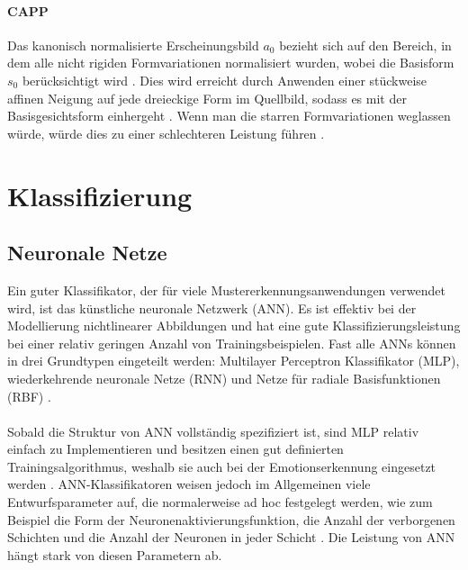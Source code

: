 \documentclass[12pt,a4paper,headinclude,twoside, plainheadsepline, open=right,numbers=noenddot]{scrreprt}
\begin{document}
\paragraph{CAPP}
Das kanonisch normalisierte Erscheinungsbild $a_0$ bezieht sich auf den Bereich, in dem alle nicht rigiden Formvariationen normalisiert wurden, wobei die Basisform $s_0$ berücksichtigt wird \cite{Lucey2010CK+}. Dies wird erreicht durch Anwenden einer stückweise affinen Neigung auf jede dreieckige Form im Quellbild, sodass es mit der Basisgesichtsform einhergeht \cite{Lucey2010CK+}. Wenn man die starren Formvariationen weglassen würde, würde dies zu einer schlechteren Leistung führen \cite{Lucey2010CK+}.



\section{Klassifizierung}
\subsection{Neuronale Netze}
Ein guter Klassifikator, der für viele Mustererkennungsanwendungen verwendet wird, ist das künstliche neuronale Netzwerk (ANN). Es ist effektiv bei der Modellierung nichtlinearer Abbildungen und hat eine gute Klassifizierungsleistung bei einer relativ geringen Anzahl von Trainingsbeispielen. Fast alle ANNs können in drei Grundtypen eingeteilt werden: Multilayer Perceptron Klassifikator (MLP), wiederkehrende neuronale Netze (RNN) und Netze für radiale Basisfunktionen (RBF) \cite{MoatazElAyadi2011SpeechEmotionRecognition}.
\paragraph{}
Sobald die Struktur von ANN vollständig spezifiziert ist, sind MLP relativ einfach zu Implementieren und besitzen einen gut definierten Trainingsalgorithmus, weshalb sie auch bei der Emotionserkennung eingesetzt werden \cite{Lyons1998CodingFacialExpressionsWithGaborWavelets}. ANN-Klassifikatoren weisen jedoch im Allgemeinen viele Entwurfsparameter auf, die normalerweise ad hoc festgelegt werden, wie zum Beispiel die Form der Neuronenaktivierungsfunktion, die Anzahl der verborgenen Schichten und die Anzahl der Neuronen in jeder Schicht \cite{MoatazElAyadi2011SpeechEmotionRecognition}. Die Leistung von ANN hängt stark von diesen Parametern ab.
\end{document}
